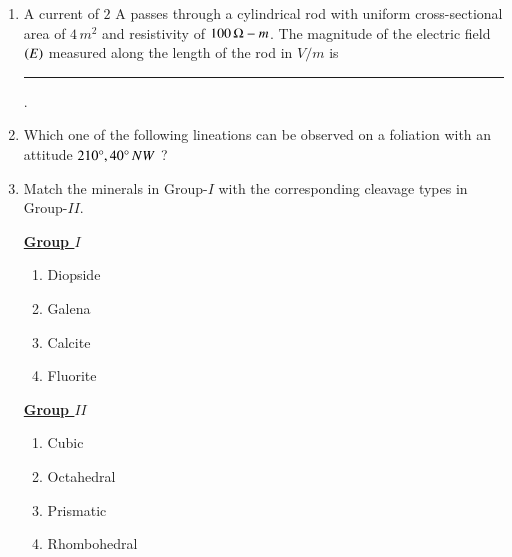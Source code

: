\documentclass[journal,12pt,onecolumn]{IEEEtran}
\theoremstyle{remark}
\begin{document}
\begin{enumerate}
\item A current of $2$ A passes through a cylindrical rod with uniform cross-sectional area of $4\,m^2$ and resistivity of $100\,\ohm-m$. The magnitude of the electric field $\left(E\right)$ measured along the length of the rod in $V/m$ is \rule{3cm}{0.15mm} .
\hfill{}

\item Which one of the following lineations can be observed on a foliation with an attitude $210\degree, 40\degree\,NW$ ?
\begin{enumerate}
\end{enumerate}
\hfill{}

\item Match the minerals in Group-$I$ with the corresponding cleavage types in Group-$II$.

\begin{multicols}{2}
            \underline{\textbf{Group $I$}}
            \begin{enumerate}[start =16]
                \item Diopside
                \item Galena
                \item Calcite
                \item Fluorite
            \end{enumerate}

            \columnbreak

            \underline{\textbf{Group $II$}}
            \begin{enumerate}
                \item Cubic
                \item Octahedral
                \item Prismatic
                \item Rhombohedral
            \end{enumerate}
        \end{multicols}
\begin{enumerate}
\end{enumerate}
\hfill{}


\end{enumerate}
\end{document}
